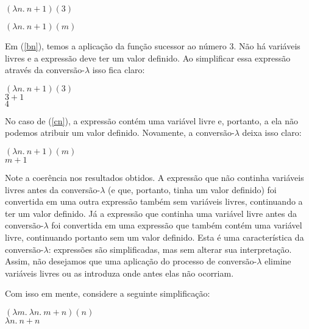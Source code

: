 \begin{exe}
	\ex  $(\lambda n.\ n+1)(3)$ \label{bn}
\end{exe}

\begin{exe}
	\ex  $(\lambda n.\ n+1)(m)$ \label{cn}
\end{exe}

\n Em (\ref{bn}), temos a aplicação da função sucessor ao
número 3. Não há variáveis livres e a expressão deve ter um valor
definido. Ao simplificar essa expressão através da
conversão-$\lambda$ isso
fica claro:

\begin{exe}
	\ex $(\lambda n.\ n+1)(3)$\\
		$3+1$\\
		$4$
\end{exe}

\n No caso de (\ref{cn}), a expressão contém uma variável livre e, portanto, a ela não podemos atribuir um valor definido. Novamente,
a conversão-$\lambda$ deixa isso claro:

\begin{exe}
	\ex $(\lambda n.\ n+1)(m)$\\
		$m+1$
\end{exe}

\n Note a coerência nos resultados obtidos. A expressão que não
continha variáveis livres antes da conversão-$\lambda$ (e que,
portanto, tinha um valor definido) foi convertida em uma outra
expressão também sem variáveis livres, continuando a ter um valor
definido. Já a expressão que continha uma variável livre antes da
conversão-$\lambda$ foi convertida em uma expressão que também
contém uma variável livre, continuando portanto sem um valor
definido. Esta é uma característica da conversão-$\lambda$:
expressões são simplificadas, mas sem alterar sua interpretação.
Assim, não desejamos que uma aplicação do processo de
conversão-$\lambda$ elimine variáveis livres ou as introduza onde
antes elas não ocorriam.

Com isso em mente, considere a seguinte simplificação:

\begin{exe}
	\ex  $(\lambda m.\ \lambda n.\ m+n)(n)$\\
	$\lambda n.\ n+n$ \label{gg}
\end{exe}


